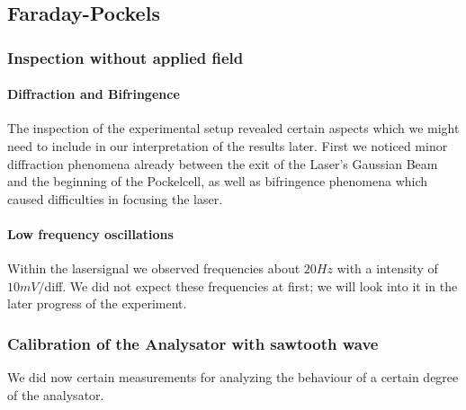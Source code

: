 \subsection{Faraday-Pockels}
\subsubsection{Inspection without applied field}
\paragraph{Diffraction and Bifringence}
The inspection of the experimental setup revealed certain aspects
which we might need to include in our interpretation of the results
later. First we noticed minor diffraction phenomena already between
the exit of the Laser's Gaussian Beam and the beginning of the
Pockelcell, as well as bifringence phenomena which caused difficulties
in focusing the laser.  
\paragraph{Low frequency oscillations} Within the lasersignal 
we observed frequencies about $20 Hz$ with a intensity of $10mV/$diff.
We did not expect these frequencies at first; we will look into it
in the later progress of the experiment.
\subsubsection{Calibration of the Analysator with sawtooth wave}
We did now certain measurements for analyzing the behaviour of a 
certain degree of the analysator.
\newcommand{\picwidth}{0.49\textwidth}

